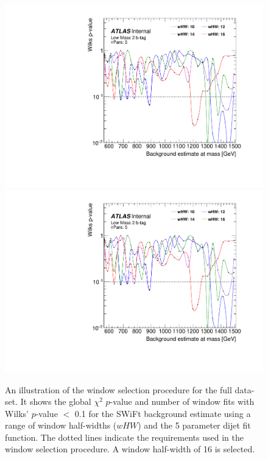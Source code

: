 \begin{figure}[!htb]
\captionsetup[subfigure]{aboveskip=0pt,justification=centering}
\centering
{} {
  \includegraphics[width=0.45\linewidth, angle=0,page=6]{figs/Dibjet/LowMass/FitStudy_min566/windowSel_unblind.pdf}
}\hspace{-5mm}
 {
  \includegraphics[width=0.45\linewidth, angle=0,page=8]{figs/Dibjet/LowMass/FitStudy_min566/windowSel_unblind.pdf}
}
\vspace{2pt}
\caption{\label{fig:windowSel_unblind}
  An illustration of the window selection procedure for the full \lm{} data-set.
  It shows the global $\chi^{2}$ \mbox{$p$-value} and number of window fits with Wilks' \mbox{$p$-value} $<$ 0.1
  for the SWiFt background estimate using a range of window half-widths ($wHW$) and the 5 parameter dijet fit function.
  The dotted lines indicate the requirements used in the window selection procedure. A window half-width of 16 is selected.
}
\end{figure}

